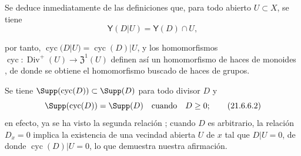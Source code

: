 Se deduce inmediatamente de las definiciones que, para todo abierto $U\subset X$, se tiene
\[
  \boldsymbol{\mathsf{Y}}(D|U)=\boldsymbol{\mathsf{Y}}(D)\cap U,
\]

por tanto, $\operatorname{cyc}(D|U)=\operatorname{cyc}(D)|U$, y los homomorfismos $\operatorname{cyc}:\operatorname{Div}^+(U)\to\mathfrak{Z}^1(U)$ definen así un homomorfismo de haces de monoides , de donde se obtiene el homomorfismo buscado  de haces de grupos.

Se tiene $\Supp(\operatorname{cyc}(D))\subset\Supp(D)$ para todo divisor $D$ y
\begin{equation}
  \Supp(\operatorname{cyc}(D))=\Supp(D)\quad\text{cuando}\quad D\geq0;
  \tag{21.6.6.2}\label{IV.21.6.6.2}
\end{equation}
en efecto, ya se ha visto la segunda relación ;
cuando $D$ es arbitrario, la relación $D_x=0$ implica la existencia de una vecindad abierta $U$ de $x$ tal que $D|U=0$, de donde $\operatorname{cyc}(D)|U=0$, lo que demuestra nuestra afirmación.

